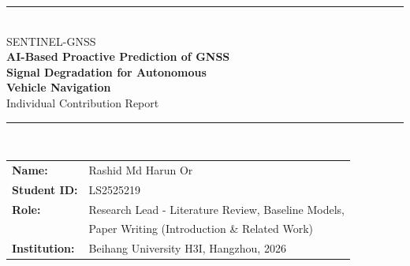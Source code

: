 \documentclass[12pt,a4paper]{article}
\begin{document}

\begin{center}
  {\color{buaaNavy}\rule{\linewidth}{2pt}}\\[0.5cm]
  {\normalsize\color{buaaBlue} SENTINEL-GNSS}\\[0.25cm]
  {\LARGE\bfseries\color{buaaNavy} AI-Based Proactive Prediction of GNSS\\[0.2cm]
   Signal Degradation for Autonomous\\[0.4cm]
   Vehicle Navigation}\\[0.45cm]
  {\large\color{buaaBlue} Individual Contribution Report}\\[0.5cm]
  {\color{buaaNavy}\rule{\linewidth}{2pt}}\\[0.8cm]

  \begin{tabular}{ll}
    \textbf{Name:}       & Rashid Md Harun Or \\
    \textbf{Student ID:} & LS2525219 \\
    \textbf{Role:}       & Research Lead - Literature Review, Baseline Models, \\
                         & Paper Writing (Introduction \& Related Work) \\
    \textbf{Institution:}& Beihang University H3I, Hangzhou, 2026 \\
  \end{tabular}
\end{center}
\vspace{0.8cm}

\begin{abstract}
This report documents my contributions to the SENTINEL-GNSS pilot project in full depth.
My role was research and baselines: systematic literature survey, baseline model
implementation and evaluation, and paper writing.

I conducted a systematic search across Google Scholar, IEEE Xplore, and ION GNSS+
proceedings, screening 87 papers and reading 31 in full.
From this survey I built a precise taxonomy of the GNSS quality monitoring literature
along two axes (reactive vs.\ predictive; in-domain vs.\ cross-geography), which
revealed the gap that SENTINEL fills.

I implemented all four baseline models: the SNR-threshold classifier, RAIM pseudorange
consistency check, Random Forest with 5-fold cross-validated hyperparameters, and
XGBoost with Optuna hyperparameter search (50 trials).
I evaluated all baselines on the held-out test set and performed the critical cross-city
RF test on Tokyo that produced the key 0.15 DEGRADED F1 result used throughout the paper.

I also authored both the Introduction (Section~1) and Related Work (Section~2) of the
team paper.
The in-domain XGBoost result (Macro-F1\,=\,0.919), the Tokyo RF collapse (DEGRADED
F1\,=\,0.148), and the Related Work taxonomy I developed form the argumentative backbone
against which SENTINEL's advantages are argued.
\end{abstract}
\end{document}
